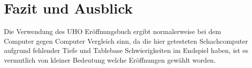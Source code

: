 \chapter{Fazit und Ausblick}

Die Verwendung des \ac{UHO} Eröffnungsbuch ergibt normalerweise bei dem Computer gegen Computer Vergleich sinn, da die hier getesteten Schachcomputer aufgrund fehlender Tiefe und Tablebase Schwierigkeiten im Endspiel haben, ist es vermutlich von kleiner Bedeutung welche Eröffnungen gewählt worden.






